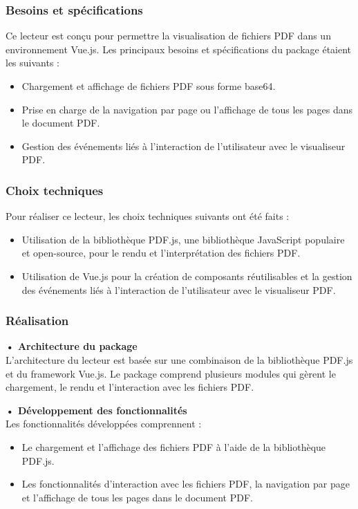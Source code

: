 \subsubsection{Besoins et spécifications}
Ce lecteur est conçu pour permettre la visualisation de fichiers PDF dans un environnement Vue.js. Les principaux besoins et spécifications du package étaient les suivants :
\begin{itemize}
  \item Chargement et affichage de fichiers PDF sous forme base64.
  \item Prise en charge de la navigation par page ou l'affichage de tous les pages dans le document PDF.
  \item Gestion des événements liés à l'interaction de l'utilisateur avec le visualiseur PDF.
\end{itemize}

\subsubsection{Choix techniques}
Pour réaliser ce lecteur, les choix techniques suivants ont été faits :
\begin{itemize}
  \item Utilisation de la bibliothèque PDF.js, une bibliothèque JavaScript populaire et open-source, pour le rendu et l'interprétation des fichiers PDF.
  \item Utilisation de Vue.js pour la création de composants réutilisables et la gestion des événements liés à l'interaction de l'utilisateur avec le visualiseur PDF.
\end{itemize}

\subsubsection{Réalisation}

\textbf{•	Architecture du package}\\
L'architecture du lecteur est basée sur une combinaison de la bibliothèque PDF.js et du framework Vue.js. Le package comprend plusieurs modules qui gèrent le chargement, le rendu et l'interaction avec les fichiers PDF.

\textbf{•	Développement des fonctionnalités }\\
Les fonctionnalités développées comprennent :

\begin{itemize}
  \item Le chargement et l'affichage des fichiers PDF à l'aide de la bibliothèque PDF.js.
  \item Les fonctionnalités d'interaction avec les fichiers PDF, la navigation par page et l'affichage de tous les pages dans le document PDF.
\end{itemize}

